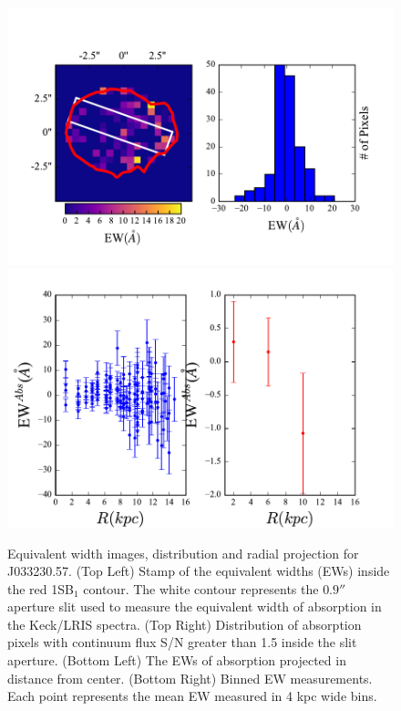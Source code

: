 \documentclass[twocolumn]{aastex61}
\begin{document}
\begin{figure}[]
\centering
\includegraphics[scale=0.9]{../Figures/J57EW.pdf}
\includegraphics[scale=0.9]{../Figures/J57EW_2.pdf}
\caption{Equivalent width images, distribution and radial projection for J033230.57. (Top Left) Stamp of the equivalent widths (EWs) inside the red 1SB$_1$ contour. The white contour represents the $0.9''$ aperture slit used to measure the equivalent width of absorption in the Keck/LRIS spectra. (Top Right) Distribution of absorption pixels with continuum flux S/N greater than 1.5 inside the slit aperture. (Bottom Left) The EWs of absorption projected in distance from center. (Bottom Right) Binned EW measurements. Each point represents the mean EW measured in 4 kpc wide bins.}
\label{fig:ew55}
\end{figure}
\end{document}
